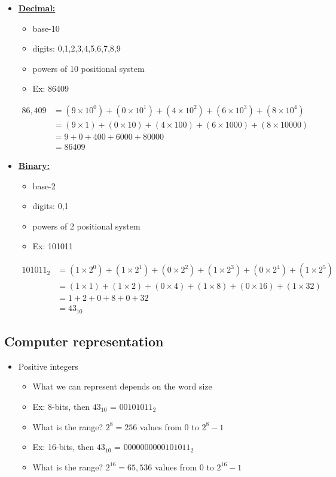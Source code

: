 \documentclass [titlepage,12pt,letter] {article}
\begin{document}
\begin{itemize}
\item{\underline{\bf Decimal:}}
\begin{itemize}
\item{base-10}
\item{digits: 0,1,2,3,4,5,6,7,8,9}
\item{powers of 10 positional system}
\item{Ex: 86409}
\end{itemize}

\begin{align*}
86,409 &= (9 \times 10^0) + (0 \times 10^1) + (4 \times 10^2) + (6 \times 10^3) + (8 \times 10^4) \\
&= (9 \times 1) + (0 \times 10) + (4 \times 100) + (6 \times 1000) + (8 \times 10000) \\
&= 9 + 0 + 400 + 6000 + 80000 \\
&= 86409
\end{align*}

\item{\underline{\bf Binary:}}
\begin{itemize}
\item{base-2}
\item{digits: 0,1}
\item{powers of 2 positional system}
\item{Ex: 101011}
\end{itemize}
\begin{align*}
101011_2 &= (1 \times 2^0) + (1 \times 2^1) + (0 \times 2^2) + (1 \times 2^3) + (0 \times 2^4) + (1 \times 2^5) \\
&= (1 \times 1) + (1 \times 2) + (0 \times 4) + (1 \times 8) + (0 \times 16) + (1 \times 32) \\
&= 1 + 2 + 0 + 8 + 0 + 32 \\
&= 43_{10}
\end{align*}
\end{itemize}


\subsection{Computer representation}
\begin{itemize}
\item{Positive integers}
\begin{itemize}
\item{What we can represent depends on the word size}
\item{Ex: 8-bits, then $43_{10}$ = $00101011_{2}$}
\item{What is the range? $2^8=256$ values from 0 to $2^8 - 1$}
\item{Ex: 16-bits, then $43_{10}$ = $0000000000101011_{2}$}
\item{What is the range? $2^{16}=65,536$ values from 0 to $2^{16} - 1$}
\end{itemize}
\end{itemize}
\end{document}
